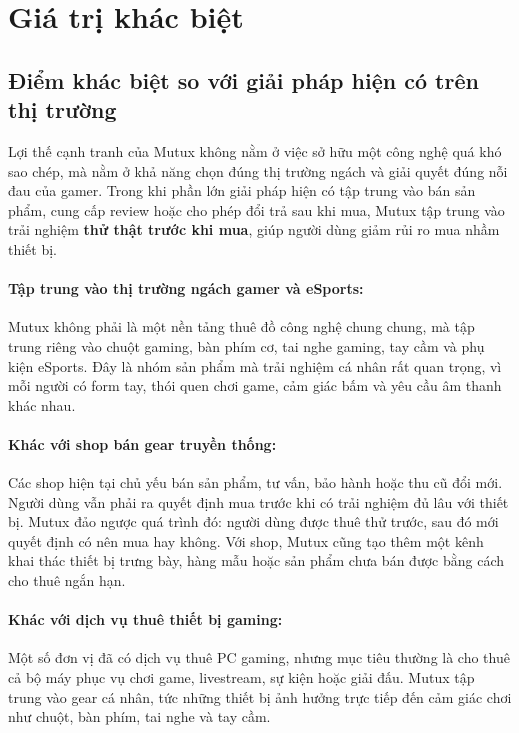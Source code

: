 \section{Giá trị khác biệt}
\subsection{Điểm khác biệt so với giải pháp hiện có trên thị trường}

Lợi thế cạnh tranh của Mutux không nằm ở việc sở hữu một công nghệ quá khó sao chép, mà nằm ở khả năng chọn đúng thị trường ngách và giải quyết đúng nỗi đau của gamer. Trong khi phần lớn giải pháp hiện có tập trung vào bán sản phẩm, cung cấp review hoặc cho phép đổi trả sau khi mua, Mutux tập trung vào trải nghiệm \textbf{thử thật trước khi mua}, giúp người dùng giảm rủi ro mua nhầm thiết bị.

\paragraph{Tập trung vào thị trường ngách gamer và eSports:}

Mutux không phải là một nền tảng thuê đồ công nghệ chung chung, mà tập trung riêng vào chuột gaming, bàn phím cơ, tai nghe gaming, tay cầm và phụ kiện eSports. Đây là nhóm sản phẩm mà trải nghiệm cá nhân rất quan trọng, vì mỗi người có form tay, thói quen chơi game, cảm giác bấm và yêu cầu âm thanh khác nhau.

\paragraph{Khác với shop bán gear truyền thống:}

Các shop hiện tại chủ yếu bán sản phẩm, tư vấn, bảo hành hoặc thu cũ đổi mới. Người dùng vẫn phải ra quyết định mua trước khi có trải nghiệm đủ lâu với thiết bị. Mutux đảo ngược quá trình đó: người dùng được thuê thử trước, sau đó mới quyết định có nên mua hay không. Với shop, Mutux cũng tạo thêm một kênh khai thác thiết bị trưng bày, hàng mẫu hoặc sản phẩm chưa bán được bằng cách cho thuê ngắn hạn.

\paragraph{Khác với dịch vụ thuê thiết bị gaming:}

Một số đơn vị đã có dịch vụ thuê PC gaming, nhưng mục tiêu thường là cho thuê cả bộ máy phục vụ chơi game, livestream, sự kiện hoặc giải đấu. Mutux tập trung vào gear cá nhân, tức những thiết bị ảnh hưởng trực tiếp đến cảm giác chơi như chuột, bàn phím, tai nghe và tay cầm.

